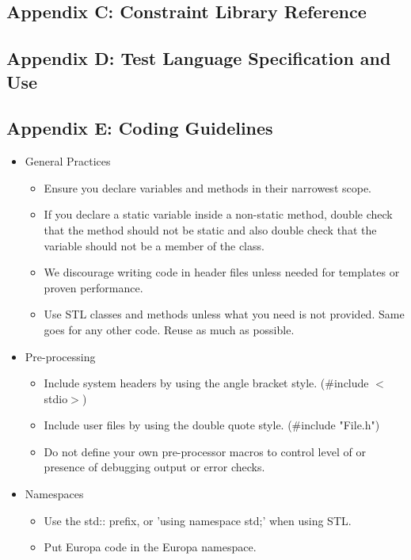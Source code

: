 \documentclass[10pt, letterpaper, twoside]{article}
\begin{document}
\subsection{Appendix C: Constraint Library Reference}
\label{constraints}

\subsection{Appendix D: Test Language Specification and Use}
\label{aver}

\subsection{Appendix E: Coding Guidelines}
\label{coding}
\begin{itemize}
\item[] General Practices
 \begin{itemize}
  \item	Ensure you declare variables and methods in their narrowest scope.
  \item	If you declare a static variable inside a non-static method, double check that the method should not be static and also double check that the variable should not be a member of the class.
  \item	We discourage writing code in header files unless needed for templates or proven performance.
  \item	Use STL classes and methods unless what you need is not provided.  Same goes for any other code.  Reuse as much as possible. 
 \end{itemize}

\item[] Pre-processing
 \begin{itemize}
  \item	Include system headers by using the angle bracket style. (\#include $<$stdio$>$)
  \item	Include user files by using the double quote style. (\#include "File.h")
  \item	Do not define your own pre-processor macros to control level of or presence of debugging output or error checks.
 \end{itemize}

\item[] Namespaces
 \begin{itemize}
  \item	Use the std:: prefix, or 'using namespace std;' when using STL.
  \item	Put Europa code in the Europa namespace.
 \end{itemize}


\end{itemize}
\end{document}
